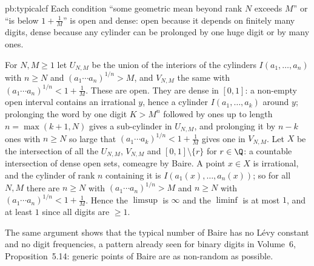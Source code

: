 \begin{solution}{pb:typicalcf}
\idea Each condition ``some geometric mean beyond rank $N$ exceeds $M$'' or ``is below $1+\frac1M$'' is open and dense: open because it depends on finitely many digits,
dense because any cylinder can be prolonged by one huge digit or by many ones.

\writeup For $N,M\ge1$ let $U_{N,M}$ be the union of the interiors of the cylinders $I(a_1,\dots,a_n)$ with $n\ge N$ and $(a_1\cdots a_n)^{1/n}>M$, and $V_{N,M}$ the
same with $(a_1\cdots a_n)^{1/n}<1+\frac1M$. These are open. They are dense in $[0,1]$: a non-empty open interval contains an irrational $y$, hence a cylinder
$I(a_1,\dots,a_k)$ around $y$; prolonging the word by one digit $K>M^n$ followed by ones up to length $n=\max(k+1,N)$ gives a sub-cylinder in $U_{N,M}$, and prolonging it
by $n-k$ ones with $n\ge N$ so large that $(a_1\cdots a_k)^{1/n}<1+\frac1M$ gives one in $V_{N,M}$. Let $X$ be the intersection of all the $U_{N,M}$, $V_{N,M}$ and
$[0,1]\setminus\{r\}$ for $r\in\Q$: a countable intersection of dense open sets, comeagre by Baire. A point $x\in X$ is irrational, and the cylinder of rank $n$ containing
it is $I(a_1(x),\dots,a_n(x))$; so for all $N,M$ there are $n\ge N$ with $(a_1\cdots a_n)^{1/n}>M$ and $n\ge N$ with $(a_1\cdots a_n)^{1/n}<1+\frac1M$. Hence the
$\limsup$ is $\infty$ and the $\liminf$ is at most $1$, and at least $1$ since all digits are $\ge1$.

\leads The same argument shows that the typical number of Baire has no Lévy constant and no digit frequencies, a pattern already seen for binary digits in Volume~6,
Proposition~5.14: generic points of Baire are as non-random as possible.
\end{solution}

